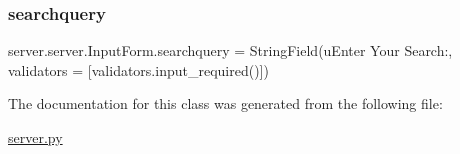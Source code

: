 \subsubsection{\texorpdfstring{searchquery}{searchquery}}
{\footnotesize\ttfamily server.\+server.\+Input\+Form.\+searchquery = String\+Field(u\textquotesingle{}Enter Your Search\+:\textquotesingle{}, validators = \mbox{[}validators.\+input\+\_\+required()\mbox{]})\hspace{0.3cm}{\ttfamily [static]}}



The documentation for this class was generated from the following file\+:\begin{DoxyCompactItemize}
\item 
\mbox{\hyperlink{server_8py}{server.\+py}}\end{DoxyCompactItemize}
